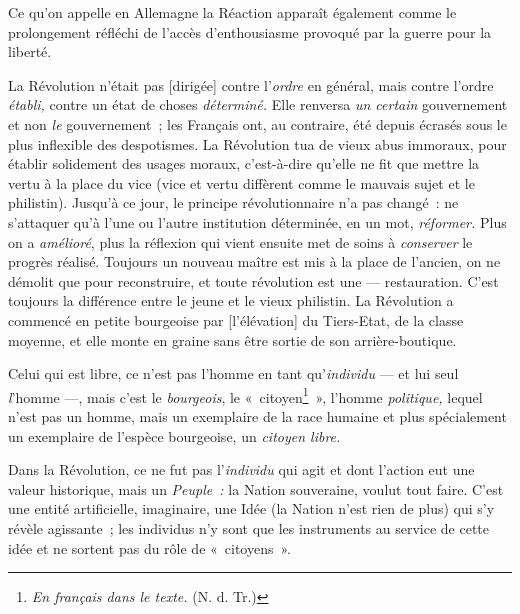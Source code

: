 \documentclass[french,twoside]{book} %
\newcommand\corr[1]{#1}
\begin{document}
Ce qu’on appelle en Allemagne la Réaction apparaît également comme le prolongement réfléchi de l’accès d’enthousiasme provoqué par la guerre pour la liberté.\par
La Révolution n’était pas [{\corr dirigée}] contre l’\emph{ordre} en général, mais contre l’ordre \emph{établi,} contre un état de choses \emph{déterminé.} Elle renversa \emph{un certain} gouvernement et non \emph{le} gouvernement ; les Français ont, au contraire, été depuis écrasés sous le plus inflexible des despotismes. La Révolution tua de vieux abus immoraux, pour établir solidement des usages moraux, c’est-à-dire qu’elle ne fit que mettre la vertu à la place du vice (vice et vertu diffèrent comme le mauvais sujet et le philistin). Jusqu’à ce jour, le principe révolutionnaire n’a pas changé : ne s’attaquer qu’à l’une ou l’autre institution déterminée, en un mot, \emph{réformer.} Plus on a \emph{amélioré}, plus la réflexion qui vient ensuite met de soins à \emph{conserver} le progrès réalisé. Toujours un nouveau maître est mis à la place de l’ancien, on ne démolit que pour reconstruire, et toute révolution est une — restauration. C’est toujours la différence entre le jeune et le vieux philistin. La Révolution a commencé en petite bourgeoise par [{\corr l’élévation}] du Tiers-Etat, de la classe moyenne, et elle monte en graine sans être sortie de son arrière-boutique.\par
Celui qui est libre, ce n’est pas l’homme en tant qu’\emph{individu} — et lui seul \emph{l}’homme —, mais c’est le \emph{bourgeois}, le « citoyen\footnote{ \noindent \emph{En français dans le texte.} (N. d. Tr.)
 } », l’homme \emph{politique,} lequel n’est pas un homme, mais un exemplaire de la race humaine et plus spécialement un exemplaire de l’espèce bourgeoise, un \emph{citoyen libre.}\par
Dans la Révolution, ce ne fut pas l’\emph{individu} qui agit et dont l’action eut une valeur historique, mais  un \emph{Peuple :} la Nation souveraine, voulut tout faire. C’est une entité artificielle, imaginaire, une Idée (la Nation n’est rien de plus) qui s’y révèle agissante ; les individus n’y sont que les instruments au service de cette idée et ne sortent pas du rôle de « citoyens ».\par
\end{document}
